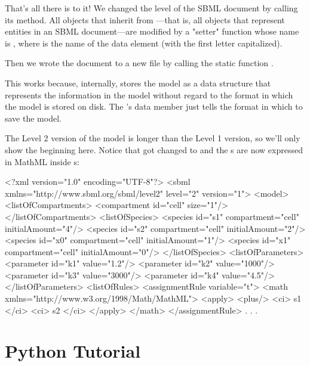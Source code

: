 \documentclass{sbmlmanual}
\begin{document}
That's all there is to it!  We changed the level of the SBML
document by calling its  method.  All \libsbml{}
objects that inherit from ---that is, all \libsbml{} objects
that represent entities in an SBML document---are modified by
a "setter" function whose name is , where  is
the name of the data element (with the first letter
capitalized).

Then we wrote the document to a new file by calling the
static function .

This works because, internally, \libsbml{} stores the model as a
data structure that represents the information in the model
without regard to the format in which the model is stored on
disk.  The 's  data member just tells
 the format in which to save the model.

The Level 2 version of the model is longer than the Level 1
version, so we'll only show the beginning here.  Notice that
 got changed to  and the s are
now expressed in MathML inside s:

\begin{boxedCodeVerbatim}
<?xml version="1.0" encoding="UTF-8"?>
<sbml xmlns="http://www.sbml.org/sbml/level2" level="2" version="1">
  <model>
    <listOfCompartments>
      <compartment id="cell" size="1"/>
    </listOfCompartments>
    <listOfSpecies>
      <species id="s1" compartment="cell" initialAmount="4"/>
      <species id="s2" compartment="cell" initialAmount="2"/>
      <species id="x0" compartment="cell" initialAmount="1"/>
      <species id="x1" compartment="cell" initialAmount="0"/>
    </listOfSpecies>
    <listOfParameters>
      <parameter id="k1" value="1.2"/>
      <parameter id="k2" value="1000"/>
      <parameter id="k3" value="3000"/>
      <parameter id="k4" value="4.5"/>
    </listOfParameters>
    <listOfRules>
      <assignmentRule variable="t">
        <math xmlns="http://www.w3.org/1998/Math/MathML">
          <apply>
            <plus/>
            <ci> s1 </ci>
            <ci> s2 </ci>
          </apply>
        </math>
      </assignmentRule>
      . . .
\end{boxedCodeVerbatim}


\section{Python Tutorial}
\label{sec:python}
\end{document}
